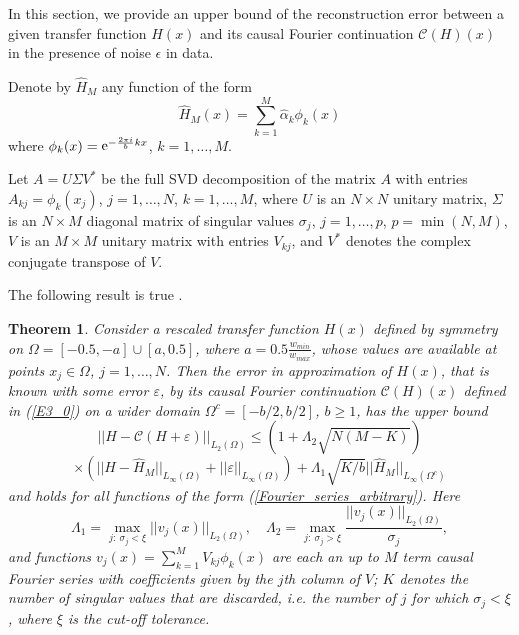 \documentclass[journal,twoside]{IEEEtran}
\newtheorem{theorem}{Theorem}{}
\begin{document}
In this section, we provide an upper bound of the reconstruction error between a given transfer function $H(x)$ and its causal Fourier continuation ${\mathcal C}(H)(x)$ in the presence of noise $\epsilon$ in data.

Denote by $\hat H_{M}$ any function of the form  
\begin{equation}\label{Fourier_series_arbitrary}
\hat H_{M}(x)=\sum_{k=1}^{M}  \hat\alpha_k \phi_k(x)
\end{equation}
where $\phi_k(x)={\mathop{\rm e}\nolimits}^{-\frac{2\pi i}{b}kx}$, $k=1,\ldots,M$. 

Let $A=U \Sigma V^*$ be the full SVD decomposition \cite{Trefethen_Bau_1997} of the matrix $A$ with entries $A_{kj}=\phi_k(x_j)$, $j=1,\ldots,N$, $k=1,\ldots, M$,
where $U$ is an $N\times N$  unitary matrix, 
$\Sigma$ is an $N\times M$ diagonal  matrix of singular values $\sigma_j$, $j=1,\ldots,p$, $p=\min({N,M})$,  $V$ is an $M \times M$ unitary matrix with entries $V_{kj}$,
 and $V^*$ denotes the complex conjugate transpose of $V$. 

The following result is true \cite{Barannyk_Aboutaleb_Elshabini_Barlow_IEEE}.

\begin{theorem} 

Consider a rescaled transfer function $H(x)$ defined by symmetry on $\Omega=[-0.5,-a]\cup[a, 0.5]$, where $a=0.5\frac{w_{min}}{w_{max}}$, whose values are available at points $x_j\in \Omega$, $j=1,\ldots,N$. Then the error in approximation of $H(x)$, that is known with some error $\varepsilon$, by 
its causal Fourier continuation ${\mathcal C}(H)(x)$ defined in (\ref{E3_0}) on a wider domain $\Omega^c=[-b/2,b/2]$, $b\geq 1$,
has the upper bound
\[
||H- {\mathcal C}(H+\varepsilon) ||_{L_2(\Omega)} \leq (1+\Lambda_2 \sqrt{N(M-K)}) 
\] 
\[
\times \left(|| H-\hat H_{M} || _{L_\infty(\Omega)} + ||\varepsilon||_{L_\infty(\Omega)} \right)
+\Lambda_1 \sqrt{K/b} ||\hat H_{M}||_{L_\infty(\Omega^c)}
\]
and holds for all functions of the form (\ref{Fourier_series_arbitrary}). Here
\[
\Lambda_1=\max_{j:\ \sigma_j<\xi}|| v_j(x) ||_{L_2(\Omega)}, \quad
\Lambda_2=\max_{j:\ \sigma_j>\xi}\frac{||v_j(x) ||_{L_2(\Omega)}}{\sigma_j},
\]
and  functions $v_j(x)=\sum_{k=1}^{M} V_{kj} \phi_k(x)$ are each an up to $M$ term causal Fourier series with coefficients given by the $j$th column of $V$; $K$ denotes the number of singular values that are discarded, i.e. the number of $j$ for which $\sigma_j<\xi$, where $\xi$ is the cut-off tolerance. 

\end{theorem}
\end{document}
